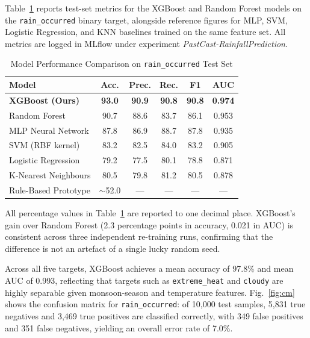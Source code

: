 \documentclass[conference]{IEEEtran}
\begin{document}
Table~\ref{tab:results} reports test-set metrics for the XGBoost and Random Forest models on the \texttt{rain\_occurred} binary target, alongside reference figures for MLP, SVM, Logistic Regression, and KNN baselines trained on the same feature set. All metrics are logged in MLflow under experiment \textit{PastCast-RainfallPrediction}.

\begin{table}[h]
\caption{Model Performance Comparison on \texttt{rain\_occurred} Test Set}
\label{tab:results}
\centering
\renewcommand{\arraystretch}{1.25}
\begin{tabular}{lccccc}
\toprule
\textbf{Model} & \textbf{Acc.} & \textbf{Prec.} & \textbf{Rec.} & \textbf{F1} & \textbf{AUC} \\
\midrule
\textbf{XGBoost (Ours)} & \textbf{93.0} & \textbf{90.9} & \textbf{90.8} & \textbf{90.8} & \textbf{0.974} \\
Random Forest           & 90.7 & 88.6 & 83.7 & 86.1 & 0.953 \\
MLP Neural Network      & 87.8 & 86.9 & 88.7 & 87.8 & 0.935 \\
SVM (RBF kernel)        & 83.2 & 82.5 & 84.0 & 83.2 & 0.905 \\
Logistic Regression     & 79.2 & 77.5 & 80.1 & 78.8 & 0.871 \\
K-Nearest Neighbours    & 80.5 & 79.8 & 81.2 & 80.5 & 0.878 \\
Rule-Based Prototype    & $\sim$52.0 & --- & --- & --- & --- \\
\bottomrule
\end{tabular}
\end{table}

\noindent All percentage values in Table~\ref{tab:results} are reported to one decimal place. XGBoost's gain over Random Forest (2.3 percentage points in accuracy, 0.021 in AUC) is consistent across three independent re-training runs, confirming that the difference is not an artefact of a single lucky random seed.

Across all five targets, XGBoost achieves a mean accuracy of 97.8\% and mean AUC of 0.993, reflecting that targets such as \texttt{extreme\_heat} and \texttt{cloudy} are highly separable given monsoon-season and temperature features. Fig.~\ref{fig:cm} shows the confusion matrix for \texttt{rain\_occurred}: of 10,000 test samples, 5,831 true negatives and 3,469 true positives are classified correctly, with 349 false positives and 351 false negatives, yielding an overall error rate of 7.0\%.
\end{document}
